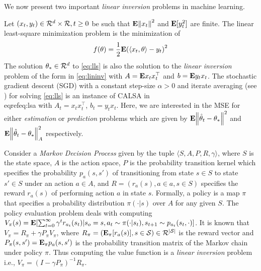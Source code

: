 {We now present two important \emph{linear inversion} problems in machine learning.
\begin{example}
Let $(x_t,y_t)\in \mathcal{R}^{d}\times \mathcal{R}, t\geq 0$ be \iid such that $\mathbf{E}{\left\| x_t\right\|^2}$ and $\mathbf{E}[y_t^2]$ are finite. The linear least-square minimization problem is the minimization of \begin{align}\label{eq:lls}
f(\theta)=\frac{1}{2}\mathbf{E}{\left(\langle x_t,\theta\rangle-y_t\right)^2}
\end{align}
The solution $\theta_*\in \mathcal{R}^d$ to \eqref{eq:lls} is also the solution to the \emph{linear inversion} problem of the form in \eqref{eq:lininv} with $A=\mathbf{E}{x_tx_t^\top}$ and $b=\mathbf{E}{y_t x_t}$. 
The stochastic gradient descent (SGD) with a constant step-size $\alpha>0$ and iterate averaging (see \citet{bach}) for solving \eqref{eq:lls} is an instance of CALSA in \\eqref{eq:lsa} with $A_t=x_tx_t^\top$, $b_t=y_t x_t$. Here, we are interested in the MSE for either \emph{estimation} or \emph{prediction} problems which are given by $\mathbf{E}{\left\| \hat{\theta}_t-\theta_*\right\|^2}$ and $\mathbf{E}{\left\| \hat{\theta}_t-\theta_*\right\|^2_A}$ respectively.
\end{example}
\begin{example}
Consider a \emph{Markov Decision Process} given by the tuple $\langle S,A,P,R,\gamma \rangle$, where $S$ is the state space, $A$ is the action space, $P$ is the probability transition kernel which specifies the probability $p_a(s,s')$ of transitioning from state $s\in S$ to state $s'\in S$ under an action $a\in A$, and $R=(r_a(s),a\in a,s\in S)$ specifies the reward $r_a(s)$ of performing action $a$ in state $s$. Formally, a policy is a map $\pi$ that specifies a probability distribution $\pi(\cdot | s)$ over $A$ for any given $S$. The policy evaluation problem deals with computing $V_\pi(s)=\mathbf{E}[\sum_{t=0}^\infty\gamma^t r_{a_t}(s_t)| s_o=s, a_t\sim\pi(\cdot|s_t), s_{t+1}\sim p_{a_t}(s_t,\cdot)]$. It is known that $V_\pi=R_\pi+\gamma P_\pi V_\pi$, where $R_\pi=(\mathbf{E}_\pi[r_a(s)],s\in\mathcal{S})\in \mathcal{R}^{|\mathcal{S}|}$ is the reward vector and $P_\pi(s,s')=\mathbf{E}_\pi p_a(s,s')$ is the probability transition matrix of the Markov chain under policy $\pi$. Thus computing the value function is a \emph{linear inversion} problem i.e., $V_\pi=(I-\gamma P_\pi)^{-1} R_\pi$.


\end{example}}
